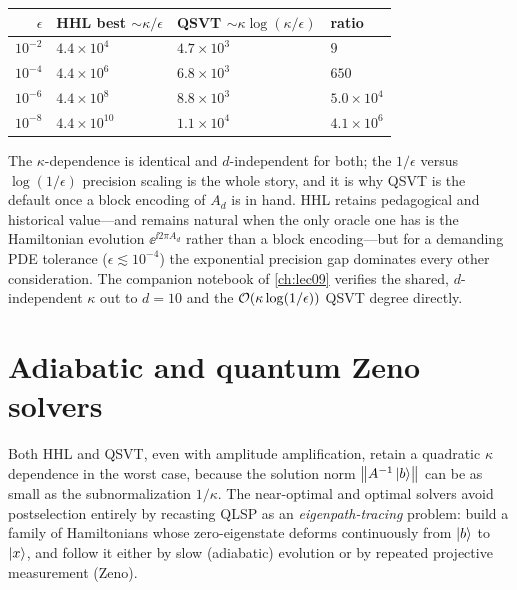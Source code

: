 \begin{example}
\begin{center}
\begin{tabular}{r l l l}
\toprule
$\epsilon$ & HHL best $\sim\kappa/\epsilon$ & QSVT $\sim\kappa\log(\kappa/\epsilon)$ & ratio\\
\midrule
$10^{-2}$ & $4.4\times10^{4}$ & $4.7\times10^{3}$ & $9$\\
$10^{-4}$ & $4.4\times10^{6}$ & $6.8\times10^{3}$ & $650$\\
$10^{-6}$ & $4.4\times10^{8}$ & $8.8\times10^{3}$ & $5.0\times10^{4}$\\
$10^{-8}$ & $4.4\times10^{10}$ & $1.1\times10^{4}$ & $4.1\times10^{6}$\\
\bottomrule
\end{tabular}
\end{center}
The $\kappa$-dependence is identical and $d$-independent for both; the $1/\epsilon$
versus $\log(1/\epsilon)$ precision scaling is the whole story, and it is why QSVT is the
default once a block encoding of $A_d$ is in hand. HHL retains pedagogical and
historical value---and remains natural when the only oracle one has is the Hamiltonian
evolution $\ee^{\ii2\pi A_d}$ rather than a block encoding---but for a demanding PDE
tolerance ($\epsilon\lesssim10^{-4}$) the exponential precision gap dominates every other
consideration. The companion notebook of \cref{ch:lec09} verifies the shared,
$d$-independent $\kappa$ out to $d=10$ and the $\mathcal{O}(\kappa\log(1/\epsilon))$ QSVT
degree directly.
\end{example}

\section{Adiabatic and quantum Zeno solvers}
\label{sec:lec10-4}

Both HHL and QSVT, even with amplitude amplification, retain a quadratic $\kappa$
dependence in the worst case, because the solution norm $\left\lVert A^{-1}\ket b \right\rVert$ can be as
small as the subnormalization $1/\kappa$. The near-optimal and optimal solvers avoid
postselection entirely by recasting QLSP as an \emph{eigenpath-tracing} problem: build a
family of Hamiltonians whose zero-eigenstate deforms continuously from $\ket b$ to
$\ket x$, and follow it either by slow (adiabatic) evolution or by repeated projective
measurement (Zeno).

